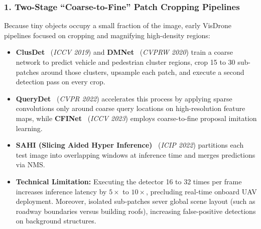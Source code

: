 \documentclass[11pt,a4paper]{article}
\begin{document}
\subsubsection*{1. Two-Stage ``Coarse-to-Fine'' Patch Cropping Pipelines}
Because tiny objects occupy a small fraction of the image, early VisDrone pipelines focused on cropping and magnifying high-density regions:
\begin{itemize}[leftmargin=1.5em]
    \item \textbf{ClusDet}~\cite{yang2019clusdet} (\emph{ICCV 2019}) and \textbf{DMNet}~\cite{li2020dmnet} (\emph{CVPRW 2020}) train a coarse network to predict vehicle and pedestrian cluster regions, crop 15 to 30 sub-patches around those clusters, upsample each patch, and execute a second detection pass on every crop.
    \item \textbf{QueryDet}~\cite{yang2022querydet} (\emph{CVPR 2022}) accelerates this process by applying sparse convolutions only around coarse query locations on high-resolution feature maps, while \textbf{CFINet}~\cite{yuan2023cfinet} (\emph{ICCV 2023}) employs coarse-to-fine proposal imitation learning.
    \item \textbf{SAHI (Slicing Aided Hyper Inference)}~\cite{akyon2022sahi} (\emph{ICIP 2022}) partitions each test image into overlapping windows at inference time and merges predictions via NMS.
    \item \textbf{Technical Limitation:} Executing the detector 16 to 32 times per frame increases inference latency by $5\times$ to $10\times$, precluding real-time onboard UAV deployment. Moreover, isolated sub-patches sever global scene layout (such as roadway boundaries versus building roofs), increasing false-positive detections on background structures.
\end{itemize}
\end{document}
